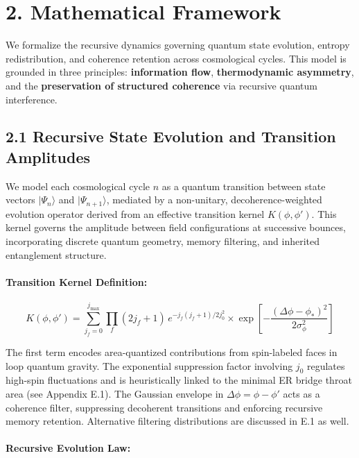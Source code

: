 \section*{2. Mathematical Framework}

We formalize the recursive dynamics governing quantum state evolution, entropy redistribution, and coherence retention across cosmological cycles. This model is grounded in three principles: \textbf{information flow}, \textbf{thermodynamic asymmetry}, and the \textbf{preservation of structured coherence} via recursive quantum interference.


\subsection*{2.1 Recursive State Evolution and Transition Amplitudes}

We model each cosmological cycle \( n \) as a quantum transition between state vectors \( |\Psi_n\rangle \) and \( |\Psi_{n+1}\rangle \), mediated by a non-unitary, decoherence-weighted evolution operator derived from an effective transition kernel \( K(\phi, \phi') \). This kernel governs the amplitude between field configurations at successive bounces, incorporating discrete quantum geometry, memory filtering, and inherited entanglement structure.

\paragraph{Transition Kernel Definition:}

\begin{equation}
K(\phi,\phi') = \sum_{j_f=0}^{j_{\text{max}}} \prod_f (2j_f+1) \, e^{-j_f(j_f+1)/2j_0^2} \times \exp\left[-\frac{(\Delta\phi - \phi_*)^2}{2\sigma_\phi^2}\right]
\end{equation}

The first term encodes area-quantized contributions from spin-labeled faces in loop quantum gravity. The exponential suppression factor involving \( j_0 \) regulates high-spin fluctuations and is heuristically linked to the minimal ER bridge throat area (see Appendix E.1). The Gaussian envelope in \( \Delta\phi = \phi - \phi' \) acts as a coherence filter, suppressing decoherent transitions and enforcing recursive memory retention. Alternative filtering distributions are discussed in E.1 as well.

\paragraph{Recursive Evolution Law:}

